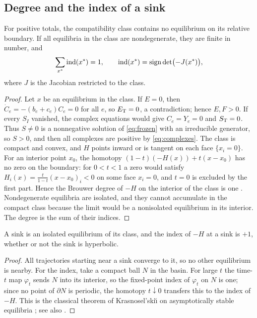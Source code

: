 \subsection{Degree and the index of a sink}
\begin{lemma}\label{lem:degree}
For positive totals, the compatibility class contains no equilibrium on its
relative boundary. If all equilibria in the class are nondegenerate, they are finite in
number, and
\begin{equation}\label{eq:degree}
 \sum_{x^*}\operatorname{ind}(x^*)=1,\qquad \operatorname{ind}(x^*)=\operatorname{sign}\det\bigl(-J(x^*)\bigr),
\end{equation}
where \(J\) is the Jacobian restricted to the class.
\end{lemma}
\begin{proof}
Let \(x\) be an equilibrium in the class. If \(E=0\), then \(\dot C_e=-(b_e+c_e)C_e=0\) for
all \(e\), so \(E_{\mathrm T}=0\), a contradiction; hence \(E,F>0\). If every \(S_I\) vanished, the
complex equations would give \(C_e=Y_e=0\) and \(S_{\mathrm T}=0\). Thus \(S\ne0\) is a nonnegative
solution of \eqref{eq:frozen} with an irreducible generator, so \(S>0\), and then all
complexes are positive by \eqref{eq:complexes}. The class is compact and convex, and \(H\)
points inward or is tangent on each face \(\{x_i=0\}\). For an interior point \(x_0\), the
homotopy \((1-t)(-H(x))+t(x-x_0)\) has no zero on the boundary: for \(0<t<1\) a zero would
satisfy \(H_i(x)=\tfrac{t}{1-t}(x-x_0)_i<0\) on some face \(x_i=0\), and \(t=0\) is excluded by
the first part. Hence the Brouwer degree of \(-H\) on the interior of the class is one
\cite{Deimling,Hofbauer1990}. Nondegenerate equilibria are isolated, and they cannot
accumulate in the compact class because the limit would be a nonisolated equilibrium in its
interior. The degree is the sum of their indices.
\end{proof}

\begin{lemma}\label{lem:index}
A sink is an isolated equilibrium of its class, and the index of \(-H\) at a sink is \(+1\),
whether or not the sink is hyperbolic.
\end{lemma}
\begin{proof}
All trajectories starting near a sink converge to it, so no other equilibrium is nearby. For
the index, take a compact ball \(N\) in the basin. For large \(t\) the time-\(t\) map
\(\varphi_t\) sends \(N\) into its interior, so the fixed-point index of \(\varphi_t\) on \(N\)
is one; since no point of \(\partial N\) is periodic, the homotopy \(t\downarrow0\) transfers
this to the index of \(-H\). This is the classical theorem of Krasnosel'ski\u{\i} on
asymptotically stable equilibria \cite{KrasnoselskiiZabreiko}; see also \cite{Companion}.
\end{proof}

